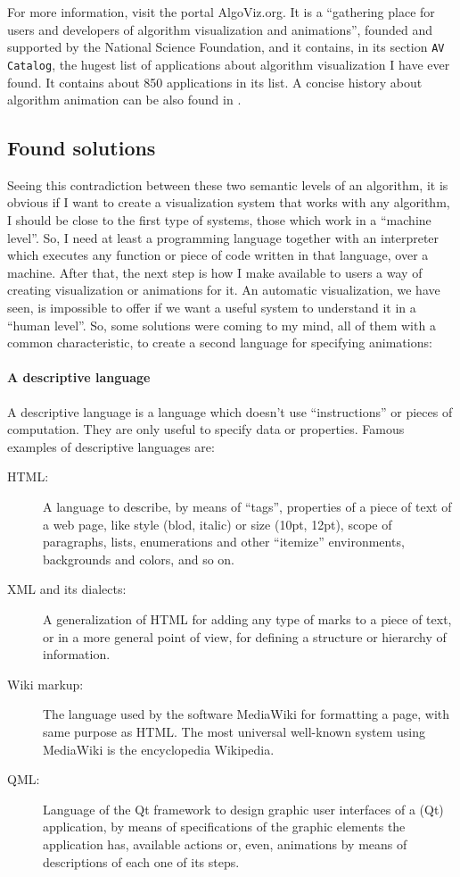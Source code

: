 \documentclass{article}
\begin{document}
For more information, visit the portal AlgoViz.org\cite{algoviz}. It is a
``gathering place for users and developers of algorithm visualization and
animations'', founded and supported by the National Science Foundation, and it
contains, in its section \texttt{AV Catalog}, the hugest list of applications
about algorithm visualization I have ever found. It contains about 850
applications in its list. A concise history about algorithm animation can be
also found in \cite{hist}.

\subsection{Found solutions}
Seeing this contradiction between these two semantic levels of an algorithm, it
is obvious if I want to create a visualization system that works with any
algorithm, I should be close to the first type of systems, those which work in a
``machine level''. So, I need at least a programming language together with an
interpreter which executes any function or piece of code written in that
language, over a machine. After that, the next step is how I make available to
users a way of creating visualization or animations for it. An automatic
visualization, we have seen, is impossible to offer if we want a useful system
to understand it in a ``human level''. So, some solutions were coming to my
mind, all of them with a common characteristic, to create a second language for
specifying animations:

\paragraph*{A descriptive language}
A descriptive language is a language which doesn't use ``instructions'' or pieces
of computation. They are only useful to specify data or properties. Famous
examples of descriptive languages are:

\begin{description}
\item[HTML:] A language to describe, by means of ``tags'',
  properties of a piece of text of a web page, like style (blod, italic) or
  size (10pt, 12pt), scope of paragraphs, lists, enumerations and other
  ``itemize'' environments, backgrounds and colors, and so on.
\item[XML and its dialects:] A generalization of HTML for adding any type of
  marks to a piece of text, or in a more general point of view, for defining a
  structure or hierarchy of information.
\item[Wiki markup:] The language used by the software MediaWiki for formatting a
  page, with same purpose as HTML. The most universal well-known system using
  MediaWiki is the encyclopedia Wikipedia.
\item[QML:] Language of the Qt framework to design graphic user interfaces of a
  (Qt) application, by means of specifications of the graphic elements the
  application has, available actions or, even, animations by means of
  descriptions of each one of its steps.
\end{description}
\end{document}
